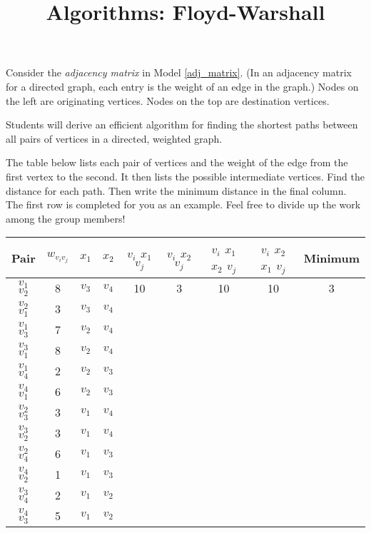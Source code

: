 \documentclass{tufte-handout}
\title{Algorithms: Floyd-Warshall}
\date{}
\begin{document}
\maketitle

\begin{questions}

\item Consider the \emph{adjacency matrix} in Model \ref{adj_matrix}. (In an adjacency matrix for a directed graph, each entry is the weight of an edge in the graph.) Nodes on the left are originating vertices. Nodes on the top are destination vertices.

\begin{objective}
  Students will derive an efficient algorithm for finding the shortest paths between all pairs of vertices in a directed, weighted graph.
\end{objective}

The table below lists each pair of vertices and the weight of the edge from the first vertex to the second. It then lists the possible intermediate vertices. Find the distance for each path. Then write the minimum distance in the final column. The first row is completed for you as an example.  Feel free to divide up the work among the group members!\label{by_hand}

\begin{tabular}{|c|c|c|c|c|c|c|c|c|}
\hline
Pair & $w_{v_i v_j}$ & $x_1$ & $x_2$ & $v_i$ $x_1$ $v_j$ & $v_i$ $x_2$ $v_j$ &$v_i$ $x_1$ $x_2$ $v_j$ &$v_i$ $x_2$ $x_1$ $v_j$ & Minimum\\
\hline
$v_1$ $v_2$ & 8 & $v_3$ & $v_4$ & 10 & 3 & 10 & 10 & 3 \\
\hline
$v_2$ $v_1$ & 3 & $v_3$ & $v_4$ &  &  &  &  &  \\
\hline
$v_1$ $v_3$ & 7 & $v_2$ & $v_4$ &  &  &  &  &  \\ 
\hline
$v_3$ $v_1$ & 8 & $v_2$ & $v_4$ &  &  &  &  &  \\ 
\hline
$v_1$ $v_4$ & 2 & $v_2$ & $v_3$ &  &  &  &  & \\ 
\hline
$v_4$ $v_1$ & 6 & $v_2$ & $v_3$ &  &  &  &  & \\ 
\hline
$v_2$ $v_3$ & 3 & $v_1$ & $v_4$ &  &  &  &  & \\ 
\hline
$v_3$ $v_2$ & 3 & $v_1$ & $v_4$ &  &  &  &  & \\ 
\hline
$v_2$ $v_4$ & 6 & $v_1$ & $v_3$ &  &  &  &  & \\ 
\hline
$v_4$ $v_2$ & 1 & $v_1$ & $v_3$ &  &  &  &  & \\
\hline
$v_3$ $v_4$ & 2 & $v_1$ & $v_2$ &  &  &  &  & \\
\hline
$v_4$ $v_3$ & 5 & $v_1$ & $v_2$ &  &  &  &  & \\
\hline
\end{tabular}


\end{questions}
\end{document}

